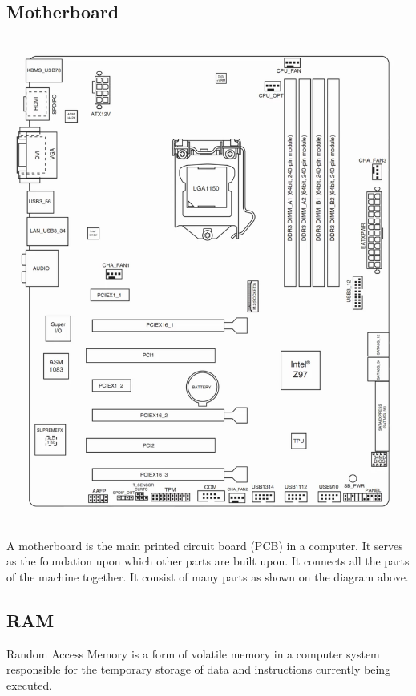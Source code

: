 \documentclass[12pt, a4paper]{article}
\begin{document}
\subsection{Motherboard}
\begin{center}
  \includegraphics[scale=0.2]{motherboard.png}
\end{center}

A motherboard is the main printed circuit board (PCB) in a computer.
It serves as the foundation upon which other parts are built upon. 
It connects all the parts of the machine together. It consist of many 
parts as shown on the diagram above.

\subsection{RAM}
Random Access Memory is a form of volatile memory in a computer system
responsible for the temporary storage of data and instructions currently
being executed.
\end{document}
